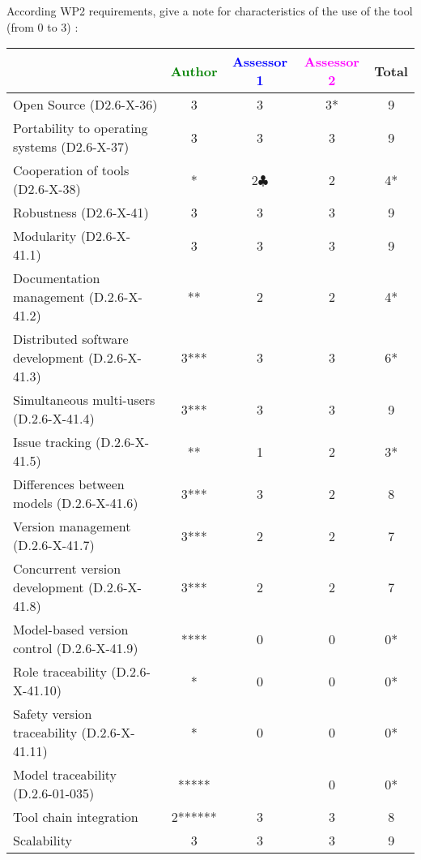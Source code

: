 According WP2 requirements, give a note for characteristics of the use of the tool (from 0 to 3) :

\begin{tabular}{|l | c | c | c | c|}
\hline
& \textcolor{green}{Author} & \textcolor{blue}{Assessor 1} & \textcolor{magenta}{Assessor 2} & Total \\
\hline
Open Source (D2.6-X-36) &3 &3 &3* & 9 \\
\hline
Portability to operating systems (D2.6-X-37) &3 &3 &3 & 9 \\
\hline
Cooperation of tools (D2.6-X-38) &* &2$\clubsuit$ &2 & 4* \\
\hline
Robustness (D2.6-X-41) &3 &3 &3 & 9 \\
\hline
Modularity (D2.6-X-41.1) &3 &3 &3 & 9 \\
\hline
Documentation management (D.2.6-X-41.2) &** &2 &2 & 4* \\
\hline
Distributed software development (D.2.6-X-41.3) &3*** &3 &3 & 6* \\
\hline
Simultaneous multi-users (D.2.6-X-41.4) &3*** & 3&3 & 9 \\
\hline
Issue tracking (D.2.6-X-41.5) &** &1 &2 & 3* \\
\hline
Differences between models (D.2.6-X-41.6) &3*** &3 &2 & 8 \\
\hline
Version management (D.2.6-X-41.7) &3*** &2 &2 & 7 \\
\hline
Concurrent version development (D.2.6-X-41.8) &3*** &2 &2 & 7 \\
\hline
Model-based version control (D.2.6-X-41.9) &**** &0 &0 & 0* \\
\hline
Role traceability (D.2.6-X-41.10) &* &0 &0 & 0* \\
\hline
Safety version traceability (D.2.6-X-41.11) &* &0 &0 & 0* \\
\hline
Model traceability (D.2.6-01-035) &***** & &0 & 0* \\
\hline
Tool chain integration &2****** &3 &3 & 8 \\
\hline
Scalability &3 &3 &3 & 9 \\
\hline
\end{tabular}

